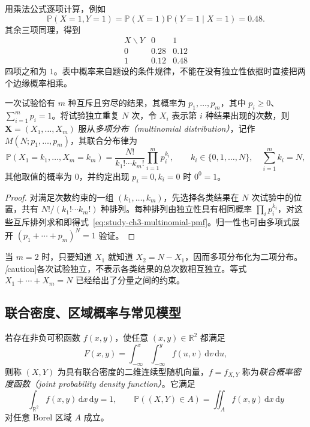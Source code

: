 \begin{solve}
用乘法公式逐项计算，例如
\[
  \mathbb P(X=1,Y=1)
  =\mathbb P(X=1)\mathbb P(Y=1\mid X=1)=0.48.
\]
其余三项同理，得到
\[
  \begin{array}{c|cc}
    X\backslash Y&0&1\\\hline
    0&0.28&0.12\\
    1&0.12&0.48
  \end{array}
\]
四项之和为 $1$。表中概率来自题设的条件规律，不能在没有独立性依据时直接把两个边缘概率相乘。
\end{solve}

\begin{definition}
\label{def:study-ch3-multinomial}
一次试验恰有 $m$ 种互斥且穷尽的结果，其概率为 $p_1,\ldots,p_m$，其中 $p_i\ge0$、$\sum_{i=1}^mp_i=1$。将试验独立重复 $N$ 次，令 $X_i$ 表示第 $i$ 种结果出现的次数，则 $\boldsymbol X=(X_1,\ldots,X_m)$ 服从\emph{多项分布（multinomial distribution）}，记作 $M(N;p_1,\ldots,p_m)$，其联合分布律为
\begin{equation}
  \mathbb P(X_1=k_1,\ldots,X_m=k_m)
  =\frac{N!}{k_1!\cdots k_m!}\prod_{i=1}^mp_i^{k_i},
  \qquad k_i\in\{0,1,\ldots,N\},\quad \sum_{i=1}^mk_i=N,
  \label{eq:study-ch3-multinomial-pmf}
\end{equation}
其他取值的概率为 $0$，并约定出现 $p_i=0,k_i=0$ 时 $0^0=1$。
\end{definition}

\begin{proof}
对满足次数约束的一组 $(k_1,\ldots,k_m)$，先选择各类结果在 $N$ 次试验中的位置，共有 $N!/(k_1!\cdots k_m!)$ 种排列。每种排列由独立性具有相同概率 $\prod_i p_i^{k_i}$，对这些互斥排列求和即得式~\eqref{eq:study-ch3-multinomial-pmf}。归一性也可由多项式展开 $(p_1+\cdots+p_m)^N=1$ 验证。
\end{proof}

当 $m=2$ 时，只要知道 $X_1$ 就知道 $X_2=N-X_1$，因而多项分布化为二项分布。\emph[caution]{各次试验独立，不表示各类结果的总次数相互独立。}等式 $X_1+\cdots+X_m=N$ 已经给出了分量之间的约束。

\subsection{联合密度、区域概率与常见模型}

\begin{definition}
\label{def:study-ch3-joint-density}
若存在非负可积函数 $f(x,y)$，使任意 $(x,y)\in\mathbb R^2$ 都满足
\begin{equation}
  F(x,y)=\int_{-\infty}^{x}\int_{-\infty}^{y}f(u,v)\,\mathrm dv\,\mathrm du,
  \label{eq:study-ch3-joint-density-cdf}
\end{equation}
则称 $(X,Y)$ 为具有联合密度的二维连续型随机向量，$f=f_{X,Y}$ 称为\emph{联合概率密度函数（joint probability density function）}。它满足
\begin{equation}
  \int_{\mathbb R^2}f(x,y)\,\mathrm dx\,\mathrm dy=1,\qquad
  \mathbb P((X,Y)\in A)=\iint_A f(x,y)\,\mathrm dx\,\mathrm dy
  \label{eq:study-ch3-joint-density-region}
\end{equation}
对任意 Borel 区域 $A$ 成立。
\end{definition}

